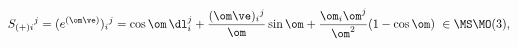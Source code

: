 \begin{equation}                                        \label{elsogr}
  S_{(+)i}{}^j=(e^{(\om\ve)})_i{}^j=\cos\om\,\dl_i^j
  +\frac{(\om\ve)_i{}^j}\om\sin\om
  +\frac{\om_i\om^j}{\om^2}(1-\cos\om)~          \in\MS\MO(3),
\end{equation}

